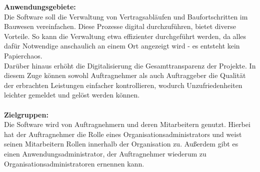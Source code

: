%

\textbf{Anwendungsgebiete:}\\
Die Software soll die Verwaltung von Vertragsabläufen und Baufortschritten im Bauwesen vereinfachen.
Diese Prozesse digital durchzuführen, bietet diverse Vorteile.
So kann die Verwaltung etwa effizienter durchgeführt werden, da alles dafür Notwendige anschaulich an einem Ort angezeigt wird - es entsteht kein Papierchaos.\\
Darüber hinaus erhöht die Digitalisierung die Gesamttransparenz der Projekte.
In diesem Zuge können sowohl Auftragnehmer als auch Auftraggeber die Qualität der erbrachten Leistungen einfacher kontrollieren, wodurch Unzufriedenheiten leichter gemeldet und gelöst werden können.\\\\

\noindent \textbf{Zielgruppen:}\\
Die Software wird von Auftragnehmern und deren Mitarbeitern genutzt.
Hierbei hat der Auftragnehmer die Rolle eines Organisationsadministrators und weist seinen Mitarbeitern Rollen innerhalb der Organisation zu.
Außerdem gibt es einen Anwendungsadministrator, der Auftragnehmer wiederum zu Organisationsadministratoren ernennen kann.